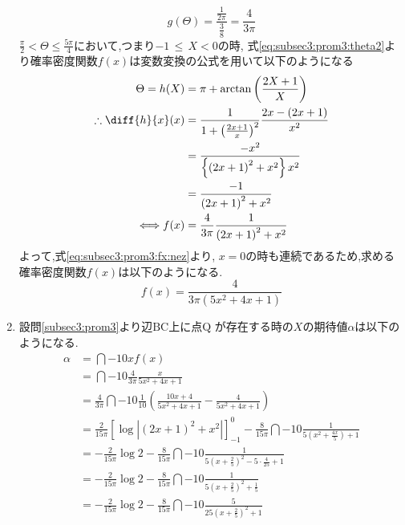 \begin{enumerate}[(1)]
  \begin{equation*}
    g(\Theta) = \frac{\frac{1}{2\pi}}{\frac{3}{8}} = \frac{4}{3\pi}
  \end{equation*}
  $\frac{\pi}{2} < \Theta \leq \frac{5\pi}{4}$において,つまり$ -1\, \leq\, X < 0$の時,
  式\eqref{eq:subsec3:prom3:theta2}より確率密度関数$f(x)$は変数変換の公式を用いて以下のようになる
  \begin{align}
    \Theta = h(X) &= \pi + \arctan\left(\frac{2X + 1}{X}\right) \nonumber\\
    \therefore \diff{h}{x}(x) &= \frac{1}{1 + \left(\frac{2x + 1}{x}\right)^2}\frac{2x - (2x + 1)}{x^2}\nonumber\\
                  &= \frac{-x^2}{\left\{\left(2x + 1\right)^2 + x^2\right\}x^2}\nonumber\\
                  &= \frac{-1}{\left(2x + 1\right)^2 + x^2}\nonumber\\
    \Longleftrightarrow 
    f(x) &= \frac{4}{3\pi}\frac{1}{\left(2x + 1\right)^2 + x^2}\label{eq:subsec3:prom3:fx:nez}
  \end{align}
  よって,式\eqref{eq:subsec3:prom3:fx:nez}より, $x=0$の時も連続であるため,求める確率密度関数$f(x)$は以下のようになる.
  \begin{equation*}
    f(x) = \frac{4}{3\pi(5x^2 + 4x + 1)}
  \end{equation*}
\item 設問\eqref{subsec3:prom3}より辺$\mathrm{BC}$上に点$\mathrm{Q}$
  が存在する時の$X$の期待値$\alpha$は以下のようになる.
  \begin{align*}
    \alpha &= \dint{-1}{0}{xf(x)}\\
          &= \dint{-1}{0}{\frac{4}{3\pi}\frac{x}{5x^2 + 4x + 1}}\\
          &= \frac{4}{3\pi}\dint{-1}{0}{\frac{1}{10}\left(\frac{10x + 4}{5x^2 + 4x + 1} - \frac{4}{5x^2 + 4x + 1}\right)}\\
          &= \frac{2}{15\pi}\left[\log |(2x + 1)^2 + x^2|\right]_{-1}^{0} - \frac{8}{15\pi}\dint{-1}{0}{\frac{1}{5(x^2 + \frac{4x}{5}) + 1}}\\
          &= -\frac{2}{15\pi}\log 2 - \frac{8}{15\pi}\dint{-1}{0}{\frac{1}{5(x + \frac{2}{5})^2 - 5\cdot \frac{4}{25} + 1}}\\
          &= -\frac{2}{15\pi}\log 2 - \frac{8}{15\pi}\dint{-1}{0}{\frac{1}{5(x + \frac{2}{5})^2 + \frac{1}{5}}}\\
          &= -\frac{2}{15\pi}\log 2 - \frac{8}{15\pi}\dint{-1}{0}{\frac{5}{25(x + \frac{2}{5})^2 + 1}}\\

\end{align*}
\end{enumerate}
